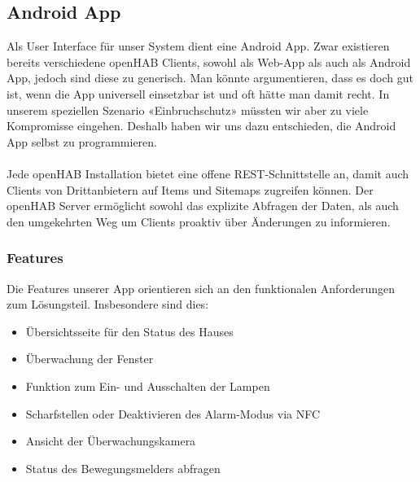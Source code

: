 \subsection{Android App}
Als User Interface für unser System dient eine Android App. Zwar existieren bereits verschiedene openHAB Clients, sowohl als Web-App als auch als Android App, jedoch sind diese zu generisch. Man könnte argumentieren, dass es doch gut ist, wenn die App universell einsetzbar ist und oft hätte man damit recht. In unserem speziellen Szenario «Einbruchschutz» müssten wir aber zu viele Kompromisse eingehen. Deshalb haben wir uns dazu entschieden, die Android App selbst zu programmieren. 
\\ \\
Jede openHAB Installation bietet eine offene REST-Schnittstelle an, damit auch Clients von Drittanbietern auf Items und Sitemaps zugreifen können. Der openHAB Server ermöglicht sowohl das explizite Abfragen der Daten, als auch den umgekehrten Weg um Clients proaktiv über Änderungen zu informieren. 

\subsubsection{Features}
Die Features unserer App orientieren sich an den funktionalen Anforderungen zum Lösungsteil. Insbesondere sind dies:

\begin{itemize}
	\item Übersichtsseite für den Status des Hauses
	\item Überwachung der Fenster
	\item Funktion zum Ein- und Ausschalten der Lampen
	\item Scharfstellen oder Deaktivieren des Alarm-Modus via NFC
	\item Ansicht der Überwachungskamera
	\item Status des Bewegungsmelders abfragen
\end{itemize}

